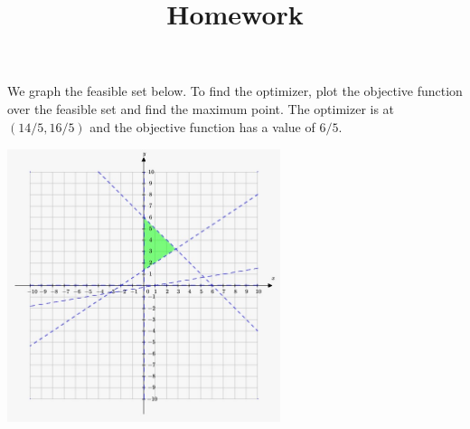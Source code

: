 \documentclass[12pt]{article}
\title{Homework}
\newenvironment{problem}[2][Problem]{\begin{trivlist}
\item[\hskip \labelsep {\bfseries #1}\hskip \labelsep {\bfseries #2}]}{\end{trivlist}}
\begin{document}
\begin{problem}{8.1.} We graph the feasible set below. To find the optimizer, plot the objective function over the feasible set and find the maximum point. The optimizer is at $(14/5, 16/5)$ and the objective function has a value of $6/5$. 
\begin{center}
\includegraphics[width=8cm, height=8cm]{prob1.jpeg}
\end{center}
\end{problem}
\end{document}
